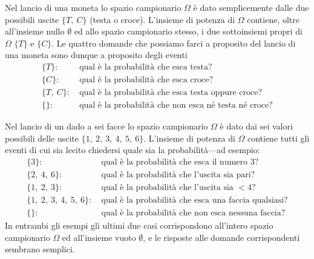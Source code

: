 \begin{examplebox}
  \begin{example}\label{exp:spazio_eventi_moneta}
    Nel lancio di una moneta lo spazio campionario $\Omega$ è dato
    semplicemente dalle due possibili uscite $\{T,~C\}$ (testa o croce).
    L'insieme di potenza di $\Omega$ contiene, oltre all'insieme nullo
    $\emptyset$ ed allo spazio campionario stesso, i due sottoinsiemi propri di
    $\Omega$ $\{T\}$ e $\{C\}$. Le quattro domande che possiamo farci a
    proposito del lancio di una moneta sono dunque a proposito degli eventi
    \begin{align*}
      \{T\}:~& \text{qual è la probabilità che esca testa?}\\
      \{C\}:~& \text{qual è la probabilità che esca croce?}\\
      \{T,~C\}:~& \text{qual è la probabilità che esca testa oppure
        croce?}\\
      \{\}:~& \text{qual è la probabilità che non esca né testa né
        croce?}
    \end{align*}
  \end{example}

  \begin{example}\label{exp:spazio_eventi_dado}
    Nel lancio di un dado a sei facce lo spazio campionario $\Omega$ è dato
    dai sei valori possibili delle uscite $\{1,~2,~3,~4,~5,~6\}$.
    L'insieme di potenza di $\Omega$ contiene tutti gli eventi di cui sia
    lecito chiedersi quale sia la probabilità---ad esempio:
    \begin{align*}
      \{3\}:~& \text{qual è la probabilità che esca il numero 3?}\\
      \{2,~4,~6\}:~&  \text{qual è la probabilità che l'uscita sia pari?}\\
      \{1,~2,~3\}:~& \text{qual è la probabilità che l'uscita sia~$< 4$?}\\
      \{1,~2,~3,~4,~5,~6\}:~& \text{qual è la probabilità che esca una
        faccia qualsiasi?}\\
      \{\}:~& \text{qual è la probabilità che non esca nessuna faccia?}
    \end{align*}
    In entrambi gli esempi gli ultimi due casi corrispondono all'intero spazio
    campionario $\Omega$ ed all'insieme vuoto $\emptyset$, e le risposte alle
    domande corrispondenti sembrano semplici.
  \end{example}
\end{examplebox}

